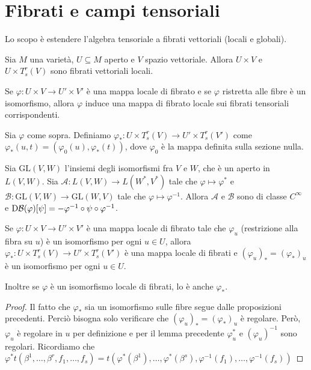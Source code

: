 \section{Fibrati e campi tensoriali}

Lo scopo è estendere l'algebra tensoriale a fibrati vettoriali (locali e globali).


Sia $M$ una varietà, $U\subseteq M$ aperto e $V$ spazio vettoriale. Allora $U\times V$ e $U\times T_s^r(V)$ sono fibrati vettoriali locali.

Se $\varphi:U\times V \to U'\times V'$ è una mappa locale di fibrato e se $\varphi$ ristretta alle fibre è un isomorfismo, allora $\varphi$ induce una mappa di fibrato locale sui fibrati tensoriali corrispondenti.

\begin{definition}
	Sia $\varphi$ come sopra. Definiamo $\varphi_*: U \times T_s^r(V) \to U'\times T_s^r(V')$ come $\varphi_*(u,t) = (\varphi_0(u), \varphi_*(t))$, dove $\varphi_0$ è la mappa definita sulla sezione nulla.
\end{definition}

\begin{lemma}
	Sia $\mathrm {GL} (V,W)$ l'insiemi degli isomorfismi fra $V$ e $W$, che è un aperto in $L(V,W)$. Sia $\mathcal A:L(V,W)\to L(W^*,V^*)$ tale che $\varphi\mapsto \varphi^*$ e $\mathcal B: \mathrm {GL} (V,W) \to \mathrm {GL} (W,V)$ tale che $\varphi \mapsto \varphi^{-1}$. %
	Allora $\mathcal A$ e $\mathcal B$ sono di classe $C^\infty$ e $\mathrm D \mathcal B(\varphi)[\psi] = -\varphi^{-1}\circ\psi\circ\varphi^{-1}$.
\end{lemma}

\begin{proposition}
	Se $\varphi:U\times V\to U'\times V'$ è una mappa locale di fibrato tale che $\varphi_u$ (restrizione alla fibra su $u$) è un isomorfismo per ogni $u\in U$, allora $\varphi_*: U\times T_s^r(V)\to U'\times T_s^r(V')$ è una mappa locale di fibrati e $(\varphi_u)_* = (\varphi_*)_u$ è un isomorfismo per ogni $u\in U$.
	
	Inoltre se $\varphi$ è un isomorfismo locale di fibrati, lo è anche $\varphi_*$.
\end{proposition}

\begin{proof}
	Il fatto che $\varphi_*$ sia un isomorfismo sulle fibre segue dalle proposizioni precedenti. %
	Perciò bisogna solo verificare che $(\varphi_u)_*=(\varphi_*)_u$ è regolare. Però, $\varphi_u$ è regolare in $u$ per definizione e per il lemma precedente $\varphi_u^*$ e $(\varphi_u)^{-1}$ sono regolari.
	Ricordiamo che $\varphi^*t(\beta^1,\dots,\beta^r,f_1,\dots,f_s) = t(\varphi^*(\beta^1),\dots,\varphi^*(\beta^s),\varphi^{-1}(f_1),\dots,\varphi^{-1}(f_s))$ %
\end{proof}






